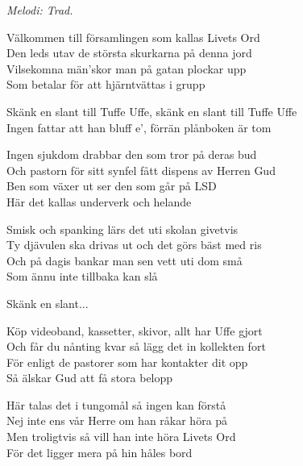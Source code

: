{\footnotesize\textit{Melodi: Trad.}}\par
\vspace{10pt}
Välkommen till församlingen som kallas Livets Ord\\
Den leds utav de största skurkarna på denna jord\\
Vilsekomna män’skor man på gatan plockar upp\\
Som betalar för att hjärntvättas i grupp\par
\vspace{10pt}
Skänk en slant till Tuffe Uffe, skänk en slant till Tuffe Uffe\\
Ingen fattar att han bluff e’, förrän plånboken är tom\par
\vspace{10pt}
Ingen sjukdom drabbar den som tror på deras bud\\
Och pastorn för sitt synfel fått dispens av Herren Gud\\
Ben som växer ut ser den som går på LSD\\
Här det kallas underverk och helande\par
\vspace{10pt}
Smisk och spanking lärs det uti skolan givetvis\\
Ty djävulen ska drivas ut och det görs bäst med ris\\
Och på dagis bankar man sen vett uti dom små\\
Som ännu inte tillbaka kan slå\par
\vspace{10pt}
Skänk en slant...\par
\vspace{10pt}
Köp videoband, kassetter, skivor, allt har Uffe gjort\\
Och får du nånting kvar så lägg det in kollekten fort\\
För enligt de pastorer som har kontakter dit opp\\
Så älskar Gud att få stora belopp\par
\vspace{10pt}
Här talas det i tungomål så ingen kan förstå\\
Nej inte ens vår Herre om han råkar höra på\\
Men troligtvis så vill han inte höra Livets Ord\\
För det ligger mera på hin håles bord\par
\vspace{10pt}
